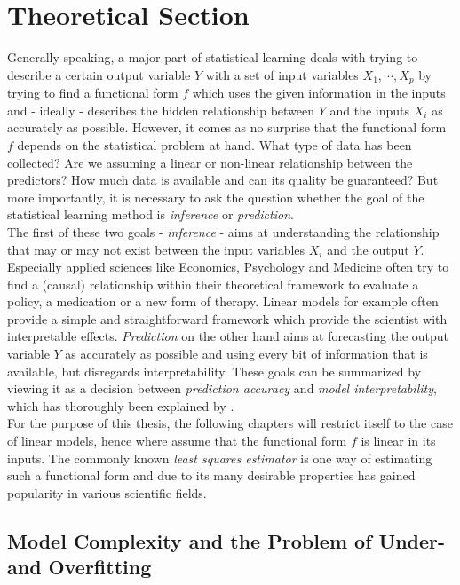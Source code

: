 \documentclass[12pt,a4paper]{article}
\begin{document}
\newpage
\section{Theoretical Section}\label{sec:theorysuper}
Generally speaking, a major part of statistical learning deals with trying to describe a certain output variable $Y$ with a set of input variables $X_1, \cdots, X_p$ by trying to find a functional form $f$ which uses the given information in the inputs and - ideally - describes the hidden relationship between $Y$ and the inputs $X_i$ as accurately as possible. However, it comes as no surprise that the functional form $f$ depends on the statistical problem at hand. What type of data has been collected? Are we assuming a linear or non-linear relationship between the predictors? How much data is available and can its quality be guaranteed? But more importantly, it is necessary to ask the question whether the goal of the statistical learning method is \textit{inference} or \textit{prediction}.\\

The first of these two goals - \textit{inference} - aims at understanding the relationship that may or may not exist between the input variables $X_i$ and the output $Y$. Especially applied sciences like Economics, Psychology and Medicine often try to find a (causal) relationship within their theoretical framework to evaluate a policy, a medication or a new form of therapy. Linear models for example often provide a simple and straightforward framework which provide the scientist with interpretable effects. \textit{Prediction} on the other hand aims at forecasting the output variable $Y$ as accurately as possible and using every bit of information that is available, but disregards interpretability. \parencite{ESL,21} These goals can be summarized by viewing it as a decision between \textit{prediction accuracy} and \textit{model interpretability}, which has thoroughly been explained by \textcite{ESL}.\\

For the purpose of this thesis, the following chapters will restrict itself to the case of linear models, hence where assume that the functional form $f$ is linear in its inputs. The commonly known \textit{least squares estimator} is one way of estimating such a functional form and due to its many desirable properties has gained popularity in various  scientific fields. 

\subsection{Model Complexity and the Problem of Under- and Overfitting}
\end{document}
